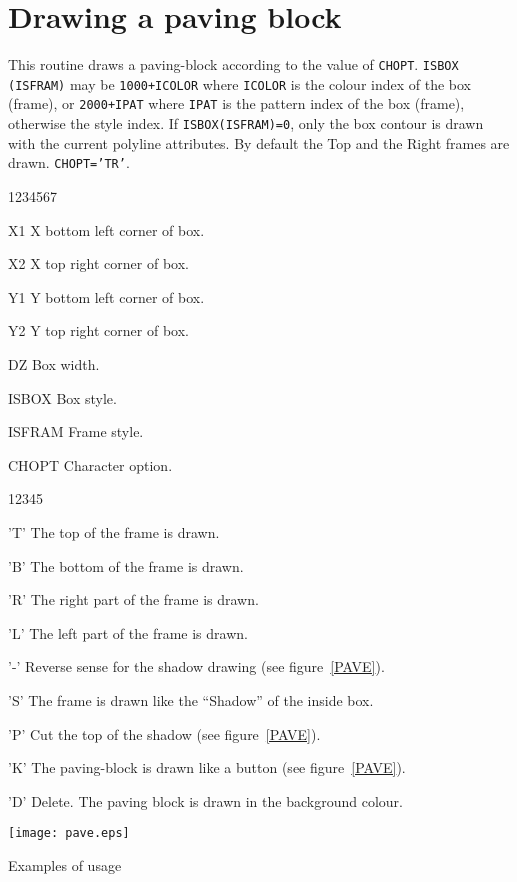 \newpage

\section{Drawing a paving block}
\Action
 This routine draws a paving-block according to the value of {\tt CHOPT}.
 {\tt ISBOX (ISFRAM)} may be {\tt 1000+ICOLOR} where {\tt ICOLOR} is the
colour index of the box (frame), or {\tt 2000+IPAT} where {\tt IPAT} is
the pattern index of the box (frame), otherwise the style index.
If {\tt ISBOX(ISFRAM)=0}, only the box contour is drawn with the current
polyline attributes. By default the Top and the Right frames are drawn.
{\tt CHOPT='TR'}.
\Pdesc
\begin{DLtt}{1234567}
\item[X1]     X bottom left corner of box.
\item[X2]     X top right corner of box.
\item[Y1]     Y bottom left corner of box.
\item[Y2]     Y top right corner of box.
\item[DZ]     Box width.
\item[ISBOX]  Box style.
\item[ISFRAM] Frame style.
\item[CHOPT]  Character option.
\begin{DLtt}{12345}
   \item['T'] The top of the frame is drawn.
   \item['B'] The bottom of the frame is drawn.
   \item['R'] The right part of the frame is drawn.
   \item['L'] The left part of the frame is drawn.
   \item['-'] Reverse sense for the shadow drawing (see figure~\ref{PAVE}).
   \item['S'] The frame is drawn like the ``Shadow'' of the inside box.
   \item['P'] Cut the top of the shadow (see figure~\ref{PAVE}).
   \item['K'] The paving-block is drawn like a button (see figure~\ref{PAVE}).
   \item['D'] Delete. The paving block is drawn in the background colour.
\end{DLtt}
\end{DLtt}
\newpage

\begin{Fighere}
\begin{center}\texttt{[image: pave.eps]}\end{center}
\caption{Examples of \protect{} usage}
\label{PAVE}
\end{Fighere}
 
